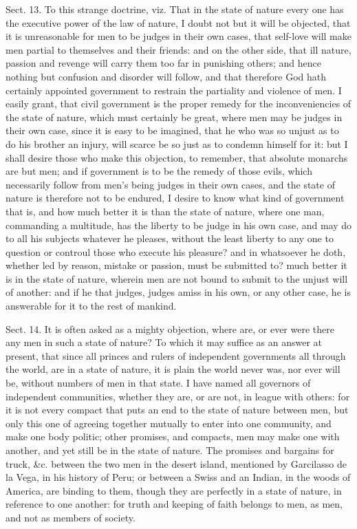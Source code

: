 \documentclass[11pt,openany]{book}
\begin{document}
Sect. 13. To this strange doctrine, viz. That in the state of nature every one has the executive power of the law of nature, I doubt not but it will be objected, that it is unreasonable for men to be judges in their own cases, that self-love will make men partial to themselves and their friends: and on the other side, that ill nature, passion and revenge will carry them too far in punishing others; and hence nothing but confusion and disorder will follow, and that therefore God hath certainly appointed government to restrain the partiality and violence of men. I easily grant, that civil government is the proper remedy for the inconveniencies of the state of nature, which must certainly be great, where men may be judges in their own case, since it is easy to be imagined, that he who was so unjust as to do his brother an injury, will scarce be so just as to condemn himself for it: but I shall desire those who make this objection, to remember, that absolute monarchs are but men; and if government is to be the remedy of those evils, which necessarily follow from men's being judges in their own cases, and the state of nature is therefore not to be endured, I desire to know what kind of government that is, and how much better it is than the state of nature, where one man, commanding a multitude, has the liberty to be judge in his own case, and may do to all his subjects whatever he pleases, without the least liberty to any one to question or controul those who execute his pleasure? and in whatsoever he doth, whether led by reason, mistake or passion, must be submitted to? much better it is in the state of nature, wherein men are not bound to submit to the unjust will of another: and if he that judges, judges amiss in his own, or any other case, he is answerable for it to the rest of mankind.

Sect. 14. It is often asked as a mighty objection, where are, or ever were there any men in such a state of nature? To which it may suffice as an answer at present, that since all princes and rulers of independent governments all through the world, are in a state of nature, it is plain the world never was, nor ever will be, without numbers of men in that state. I have named all governors of independent communities, whether they are, or are not, in league with others: for it is not every compact that puts an end to the state of nature between men, but only this one of agreeing together mutually to enter into one community, and make one body politic; other promises, and compacts, men may make one with another, and yet still be in the state of nature. The promises and bargains for truck, \&c. between the two men in the desert island, mentioned by Garcilasso de la Vega, in his history of Peru; or between a Swiss and an Indian, in the woods of America, are binding to them, though they are perfectly in a state of nature, in reference to one another: for truth and keeping of faith belongs to men, as men, and not as members of society.
\end{document}
